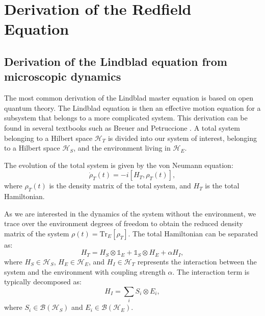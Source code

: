 
\chapter{Derivation of the Redfield Equation} %

\label{Chapter_calc_redfield_eq} %


\section{Derivation of the Lindblad equation from microscopic dynamics}

The most common derivation of the Lindblad master equation is based on open quantum theory. 
The Lindblad equation is then an effective motion equation for a subsystem that belongs to a more complicated system. 
This derivation can be found in several textbooks such as Breuer and Petruccione \cite{breuer_theory_2009}. 
A total system belonging to a Hilbert space $\mathcal{H}_T$ is divided into our system of interest, belonging to a Hilbert space $\mathcal{H}_S$, and the environment living in $\mathcal{H}_E$.

The evolution of the total system is given by the von Neumann equation:
\begin{equation}
    \dot{\rho}_T(t) = -i[H_T, \rho_T(t)],
    \label{eq:von_neumann}
\end{equation}
where $\rho_T(t)$ is the density matrix of the total system, and $H_T$ is the total Hamiltonian.

As we are interested in the dynamics of the system without the environment, we trace over the environment degrees of freedom to obtain the reduced density matrix of the system $\rho(t) = \mathrm{Tr}_E[\rho_T]$. The total Hamiltonian can be separated as:
\begin{equation}
    H_T = H_S \otimes \mathbb{1}_E + \mathbb{1}_S \otimes H_E + \alpha H_I,
    \label{eq:total_hamiltonian}
\end{equation}
where $H_S \in \mathcal{H}_S$, $H_E \in \mathcal{H}_E$, and $H_I \in \mathcal{H}_T$ represents the interaction between the system and the environment with coupling strength $\alpha$. The interaction term is typically decomposed as:
\begin{equation}
    H_I = \sum_i S_i \otimes E_i,
    \label{eq:interaction_hamiltonian}
\end{equation}
where $S_i \in \mathcal{B}(\mathcal{H}_S)$ and $E_i \in \mathcal{B}(\mathcal{H}_E)$.

